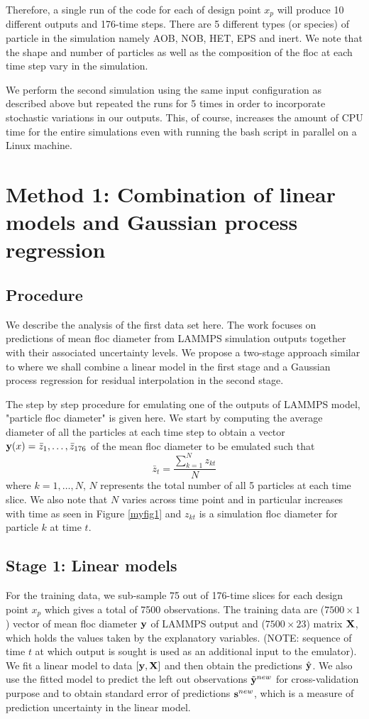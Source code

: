 \documentclass[12pt,titlepage]{report}
\newcommand{\bX}{{\bf X}}
\newcommand{\by}{{\bf y}}
\newcommand{\tby}{{\tilde {\bf y}}}
\newcommand{\hby}{{\hat {\bf y}}}
\newcommand{\bs}{{\bf s}}
\theoremstyle{definition}
\theoremstyle{remark}
\begin{document}
Therefore, a single run of the code for each of design point $x_p$ will produce 10 different outputs and 176-time steps. There are 5 different types (or species) of particle in the simulation namely AOB, NOB, HET, EPS and inert. We note that the shape and number of particles as well as the composition of the floc at each time step vary in the simulation. 

We perform the second simulation using the same input configuration as described above but repeated the runs for 5 times in order to incorporate stochastic variations in our outputs. This, of course, increases the amount of CPU time for the entire simulations even with running the bash script in parallel on a Linux machine. 


\section{Method 1: Combination of linear models and Gaussian process regression}
\subsection{Procedure}
We describe the analysis of the first data set here.
The work focuses on predictions of mean floc diameter from LAMMPS simulation outputs together with their associated uncertainty levels. We propose a two-stage approach similar to \citet{pd11} where we shall combine a linear model in the first stage and a Gaussian process regression for residual interpolation in the second stage.

The step by step procedure for emulating one of the outputs of LAMMPS model, "particle floc diameter" is given here. We start by computing the average diameter of all the particles at each time step to obtain a vector $\by(x)=\bar z_1,\ldots,\bar z_{176}$ of the mean floc diameter to be emulated such that
\begin{equation}
\bar z_t=\frac{\sum^N_{k=1} z_{kt}}{N}
\end{equation}
where $k=1,\ldots, N$, $N$ represents the total number of all 5 particles at each time slice. We also note that $N$ varies across time point and in particular increases with time as seen in Figure \ref{myfig1} and $z_{kt}$ is a simulation floc diameter for particle $k$ at time $t$.

\subsection{Stage 1: Linear models}
For the training data, we sub-sample 75 out of 176-time slices for each design point $x_p$ which gives a total of 7500 observations.
The training data are ($7500 \times 1$) vector of mean floc diameter $\by$ of LAMMPS output and ($7500 \times 23$) matrix $\bX$, which holds the values taken by the explanatory variables. (NOTE: sequence of time $t$ at which output is sought is used as an additional input to the emulator). We fit a linear model to data $[\by,\bX]$ and then obtain the predictions $\hby$.
We also use the fitted model to predict the left out observations $\tby^{new}$ for cross-validation purpose and to obtain standard error of predictions $\bs^{new}$, which is a measure of prediction uncertainty in the linear model. 
\end{document}

